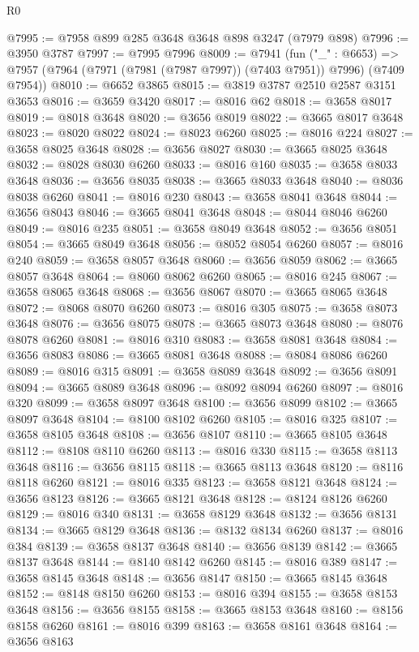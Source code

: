 \begin{lexlean}{R0}
\begin{coremodule}
@7995 := @7958 @899 @285 @3648 @3648 @898 @3247 (@7979 @898)
@7996 := @3950 @3787
@7997 := @7995 @7996
@8009 := @7941
    (fun ("_" : @6653) =>
    @7957 (@7964 (@7971 (@7981 (@7987 @7997)) (@7403 @7951)) @7996) (@7409 @7954))
@8010 := @6652 @3865
@8015 := @3819 @3787 @2510 @2587 @3151 @3653
@8016 := @3659 @3420
@8017 := @8016 @62
@8018 := @3658 @8017
@8019 := @8018 @3648
@8020 := @3656 @8019
@8022 := @3665 @8017 @3648
@8023 := @8020 @8022
@8024 := @8023 @6260
@8025 := @8016 @224
@8027 := @3658 @8025 @3648
@8028 := @3656 @8027
@8030 := @3665 @8025 @3648
@8032 := @8028 @8030 @6260
@8033 := @8016 @160
@8035 := @3658 @8033 @3648
@8036 := @3656 @8035
@8038 := @3665 @8033 @3648
@8040 := @8036 @8038 @6260
@8041 := @8016 @230
@8043 := @3658 @8041 @3648
@8044 := @3656 @8043
@8046 := @3665 @8041 @3648
@8048 := @8044 @8046 @6260
@8049 := @8016 @235
@8051 := @3658 @8049 @3648
@8052 := @3656 @8051
@8054 := @3665 @8049 @3648
@8056 := @8052 @8054 @6260
@8057 := @8016 @240
@8059 := @3658 @8057 @3648
@8060 := @3656 @8059
@8062 := @3665 @8057 @3648
@8064 := @8060 @8062 @6260
@8065 := @8016 @245
@8067 := @3658 @8065 @3648
@8068 := @3656 @8067
@8070 := @3665 @8065 @3648
@8072 := @8068 @8070 @6260
@8073 := @8016 @305
@8075 := @3658 @8073 @3648
@8076 := @3656 @8075
@8078 := @3665 @8073 @3648
@8080 := @8076 @8078 @6260
@8081 := @8016 @310
@8083 := @3658 @8081 @3648
@8084 := @3656 @8083
@8086 := @3665 @8081 @3648
@8088 := @8084 @8086 @6260
@8089 := @8016 @315
@8091 := @3658 @8089 @3648
@8092 := @3656 @8091
@8094 := @3665 @8089 @3648
@8096 := @8092 @8094 @6260
@8097 := @8016 @320
@8099 := @3658 @8097 @3648
@8100 := @3656 @8099
@8102 := @3665 @8097 @3648
@8104 := @8100 @8102 @6260
@8105 := @8016 @325
@8107 := @3658 @8105 @3648
@8108 := @3656 @8107
@8110 := @3665 @8105 @3648
@8112 := @8108 @8110 @6260
@8113 := @8016 @330
@8115 := @3658 @8113 @3648
@8116 := @3656 @8115
@8118 := @3665 @8113 @3648
@8120 := @8116 @8118 @6260
@8121 := @8016 @335
@8123 := @3658 @8121 @3648
@8124 := @3656 @8123
@8126 := @3665 @8121 @3648
@8128 := @8124 @8126 @6260
@8129 := @8016 @340
@8131 := @3658 @8129 @3648
@8132 := @3656 @8131
@8134 := @3665 @8129 @3648
@8136 := @8132 @8134 @6260
@8137 := @8016 @384
@8139 := @3658 @8137 @3648
@8140 := @3656 @8139
@8142 := @3665 @8137 @3648
@8144 := @8140 @8142 @6260
@8145 := @8016 @389
@8147 := @3658 @8145 @3648
@8148 := @3656 @8147
@8150 := @3665 @8145 @3648
@8152 := @8148 @8150 @6260
@8153 := @8016 @394
@8155 := @3658 @8153 @3648
@8156 := @3656 @8155
@8158 := @3665 @8153 @3648
@8160 := @8156 @8158 @6260
@8161 := @8016 @399
@8163 := @3658 @8161 @3648
@8164 := @3656 @8163

\end{coremodule}
\end{lexlean}
